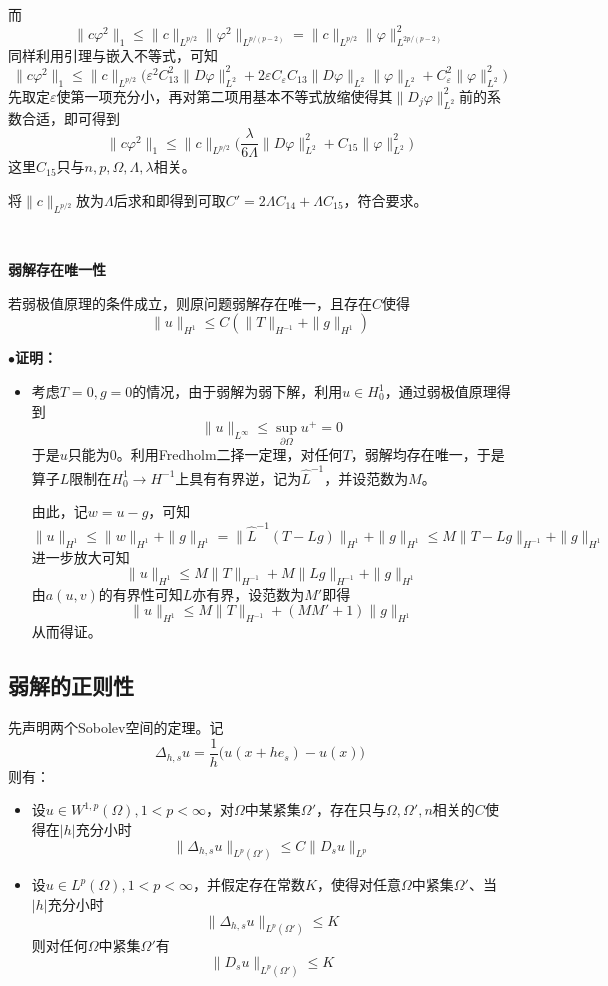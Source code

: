 \documentclass[a4paper,UTF8,fontset=windows,AutoFakeBold]{ctexart}
\newcommand{\proo}[1]{{\kaishu $\bullet$\textbf{证明：}
\begin{itemize}
    \item[] #1
\end{itemize}
}}
\begin{document}
{    而
    $$\|c\varphi^2\|_1\le\|c\|_{L^{p/2}}\|\varphi^2\|_{L^{p/(p-2)}}=\|c\|_{L^{p/2}}\|\varphi\|_{L^{2p/(p-2)}}^2$$
    同样利用引理与嵌入不等式，可知
    $$\|c\varphi^2\|_1\le\|c\|_{L^{p/2}}\bigg(\varepsilon^2C_{13}^2\|D\varphi\|_{L^2}^2+2\varepsilon C_\varepsilon C_{13}\|D\varphi\|_{L^2}\|\varphi\|_{L^2}+C_\varepsilon^2\|\varphi\|_{L^2}^2\bigg)$$
    先取定$\varepsilon$使第一项充分小，再对第二项用基本不等式放缩使得其$\|D_j\varphi\|_{L^2}^2$前的系数合适，即可得到
    $$\|c\varphi^2\|_1\le\|c\|_{L^{p/2}}\bigg(\frac{\lambda}{6\Lambda}\|D\varphi\|_{L^2}^2+C_{15}\|\varphi\|_{L^2}^2\bigg)$$
    这里$C_{15}$只与$n,p,\Omega,\Lambda,\lambda$相关。
    
    将$\|c\|_{L^{p/2}}$放为$\Lambda$后求和即得到可取$C'=2\Lambda C_{14}+\Lambda C_{15}$，符合要求。
}

\

\textbf{弱解存在唯一性}

若弱极值原理的条件成立，则原问题弱解存在唯一，且存在$C$使得
$$\|u\|_{H^1}\le C(\|T\|_{H^{-1}}+\|g\|_{H^1})$$

\proo{
    考虑$T=0,g=0$的情况，由于弱解为弱下解，利用$u\in H_0^1$，通过弱极值原理得到
    $$\|u\|_{L^\infty}\le\sup_{\partial\Omega}u^+=0$$
    于是$u$只能为0。利用Fredholm二择一定理，对任何$T$，弱解均存在唯一，于是算子$L$限制在$H_0^1\to H^{-1}$上具有有界逆，记为$\hat{L}^{-1}$，并设范数为$M$。
    
    由此，记$w=u-g$，可知
    $$\|u\|_{H^1}\le\|w\|_{H^1}+\|g\|_{H^1}=\|\hat{L}^{-1}(T-Lg)\|_{H^1}+\|g\|_{H^1}\le M\|T-Lg\|_{H^{-1}}+\|g\|_{H^1}$$
    进一步放大可知
    $$\|u\|_{H^1}\le M\|T\|_{H^{-1}}+M\|Lg\|_{H^{-1}}+\|g\|_{H^1}$$
    由$a(u,v)$的有界性可知$L$亦有界，设范数为$M'$即得
    $$\|u\|_{H^1}\le M\|T\|_{H^{-1}}+(MM'+1)\|g\|_{H^1}$$
    从而得证。
}

\subsection{弱解的正则性}
先声明两个Sobolev空间的定理。记
$$\Delta_{h,s}u=\frac{1}{h}\big(u(x+he_s)-u(x)\big)$$
则有：
\begin{itemize}
    \item 设$u\in W^{1,p}(\Omega),1<p<\infty$，对$\Omega$中某紧集$\Omega'$，存在只与$\Omega,\Omega',n$相关的$C$使得在$|h|$充分小时
    $$\|\Delta_{h,s}u\|_{L^p(\Omega')}\le C\|D_su\|_{L^p}$$
    \item 设$u\in L^p(\Omega),1<p<\infty$，并假定存在常数$K$，使得对任意$\Omega$中紧集$\Omega'$、当$|h|$充分小时 
    $$\|\Delta_{h,s}u\|_{L^p(\Omega')}\le K$$
    则对任何$\Omega$中紧集$\Omega'$有
    $$\|D_su\|_{L^p(\Omega')}\le K$$
\end{itemize}
\end{document}
